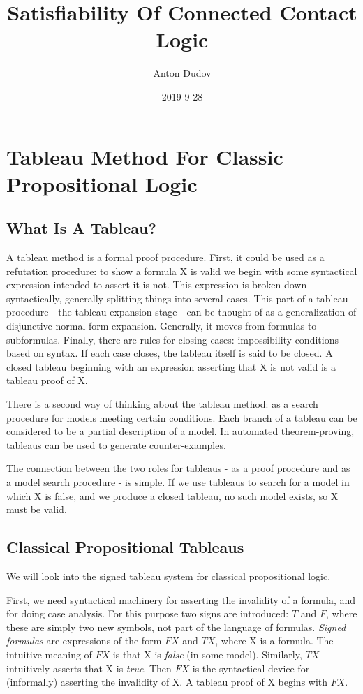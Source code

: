 \documentclass{article}
\title{Satisfiability Of Connected Contact Logic}
\date{2019-9-28}
\author{Anton Dudov}
\begin{document}
	\maketitle
	\newpage

	\tableofcontents

	\newpage

	\section{Tableau Method For Classic Propositional Logic}

	\subsection{What Is A Tableau?}
	A tableau method is a formal proof procedure. First, it could be used as a refutation procedure: to show a formula X is valid we begin with some syntactical expression intended to assert it is not. This expression is broken down syntactically, generally splitting things into several cases. This part of a tableau procedure - the tableau expansion stage - can be thought of as a generalization of disjunctive normal form expansion. Generally, it moves from formulas to subformulas. Finally, there are rules for closing cases: impossibility conditions based on syntax. If each case closes, the tableau itself is said to be closed. A closed tableau beginning with an expression asserting that X is not valid is a tableau proof of X. \par	
	There is a second way of thinking about the tableau method: as a search procedure for models meeting certain conditions. Each branch of a tableau can be considered to be a partial description of a model. In automated theorem-proving, tableaus can be used to generate counter-examples. \par	
	The connection between the two roles for tableaus - as a proof procedure and as a model search procedure - is simple. If we use tableaus to search for a model in which X is false, and we produce a closed tableau, no such model exists, so X must be valid.

	\subsection{Classical Propositional Tableaus}
	We will look into the signed tableau system for classical propositional logic.

	\par
	First, we need syntactical machinery for asserting the invalidity of a formula, and for doing case analysis. For this purpose two signs are introduced: $T$ and $F$, where these are simply two new symbols, not part of the language of formulas. \textit{Signed formulas} are expressions of the form $F X$ and $T X$, where X is a formula. The intuitive meaning of $F X$ is that X is \textit{false} (in some model). Similarly, $T X$ intuitively asserts that X is \textit{true}. Then $F X$ is the syntactical device for (informally) asserting the invalidity of X. A tableau proof of X begins with $F X$.
\end{document}
